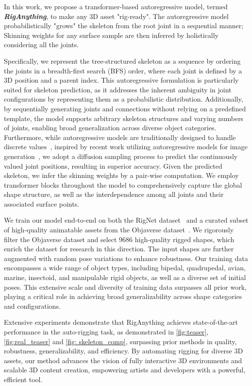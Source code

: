 In this work, we propose a transformer-based autoregressive model, termed \emph{\textbf{RigAnything}}, to make any 3D asset "rig-ready". The autoregressive model probabilistically "grows" the skeleton from the root joint in a sequential manner; Skinning weights for any surface sample are then inferred by holistically considering all the joints.

Specifically, we represent the tree-structured skeleton as a sequence by ordering the joints in a breadth-first search (BFS) order, where each joint is defined by a 3D position and a parent index. 
This autoregressive formulation is particularly suited for skeleton prediction, as it addresses the inherent ambiguity in joint configurations by representing them as a probabilistic distribution. Additionally, by sequentially generating joints and connections without relying on a predefined template, the model supports arbitrary skeleton structures and varying numbers of joints, enabling broad generalization across diverse object categories.
Furthermore, while autoregressive models are traditionally designed to handle discrete values~\cite{waswani2017attention,brown2020language,radford2019language}, inspired by recent work utilizing autoregressive models for image generation~\cite{li2024autoregressive}, we adopt a diffusion sampling process to predict the continuously valued joint positions, resulting in superior accuracy.
Given the predicted skeleton, we infer the skinning weights by a pair-wise computation.
We employ transformer blocks throughout the model to comprehensively capture the global shape structure, as well as the interdependence among all joints and their associated surface points.

We train our model end-to-end on both the RigNet dataset~\cite{rignet} and a curated subset of high-quality animatable assets from the Objaverse dataset~\cite{deitke2023objaverse}. We rigorously filter the Objaverse dataset and select 9686 high-quality rigged shapes, which enrich the dataset for research in this direction. The input shapes are further augmented with random pose variations to enhance robustness.
Our training data encompasses a wide range of object types, including bipedal, quadrupedal, avian, marine, insectoid, and manipulable rigid objects, as well as a diverse set of initial poses. This extensive scale and diversity of training data surpasses all prior work, playing a critical role in achieving broad generalizability across shape categories and configurations.



Extensive experiments demonstrate that RigAnything achieves state-of-the-art performance in the auto-rigging task, as demonstrated in \cref{fig:teaser}, \cref{fig:real_teaser} and \cref{fig: skeleton_comp}, surpassing prior methods in quality, robustness, generalizability, and efficiency. By automating rigging for diverse 3D assets, our method advances the vision of fully interactive 3D environments and scalable 3D content creation, empowering artists and developers with a powerful, efficient tool.
